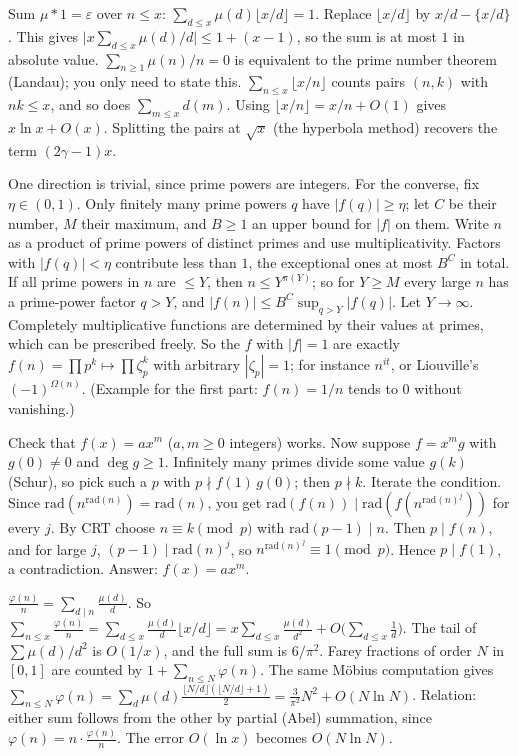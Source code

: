 \documentclass[11pt,a4paper]{article}
\begin{document}
 Sum $\mu*1=\varepsilon$ over $n\le x$: $\sum_{d\le x}\mu(d)\lfloor x/d\rfloor=1$. Replace $\lfloor x/d\rfloor$ by $x/d-\{x/d\}$. This gives $\bigl|x\sum_{d\le x}\mu(d)/d\bigr|\le1+(x-1)$, so the sum is at most $1$ in absolute value.
 $\sum_{n\ge1}\mu(n)/n=0$ is equivalent to the prime number theorem (Landau); you only need to state this.
 $\sum_{n\le x}\lfloor x/n\rfloor$ counts pairs $(n,k)$ with $nk\le x$, and so does $\sum_{m\le x}d(m)$. Using $\lfloor x/n\rfloor=x/n+O(1)$ gives $x\ln x+O(x)$. Splitting the pairs at $\sqrt x$ (the hyperbola method) recovers the term $(2\gamma-1)x$.

 One direction is trivial, since prime powers are integers. For the converse, fix $\eta\in(0,1)$. Only finitely many prime powers $q$ have $|f(q)|\ge\eta$; let $C$ be their number, $M$ their maximum, and $B\ge1$ an upper bound for $|f|$ on them.
 Write $n$ as a product of prime powers of distinct primes and use multiplicativity. Factors with $|f(q)|<\eta$ contribute less than $1$, the exceptional ones at most $B^C$ in total. If all prime powers in $n$ are $\le Y$, then $n\le Y^{\pi(Y)}$; so for $Y\ge M$ every large $n$ has a prime-power factor $q>Y$, and $|f(n)|\le B^{C}\sup_{q>Y}|f(q)|$. Let $Y\to\infty$.
 Completely multiplicative functions are determined by their values at primes, which can be prescribed freely. So the $f$ with $|f|=1$ are exactly $f(n)=\prod p^{k}\mapsto\prod\zeta_p^{k}$ with arbitrary $|\zeta_p|=1$; for instance $n^{it}$, or Liouville's $(-1)^{\Omega(n)}$. (Example for the first part: $f(n)=1/n$ tends to $0$ without vanishing.)

 Check that $f(x)=ax^m$ ($a,m\ge0$ integers) works. Now suppose $f=x^mg$ with $g(0)\ne0$ and $\deg g\ge1$. Infinitely many primes divide some value $g(k)$ (Schur), so pick such a $p$ with $p\nmid f(1)\,g(0)$; then $p\nmid k$.
 Iterate the condition. Since $\mathrm{rad}(n^{\mathrm{rad}(n)})=\mathrm{rad}(n)$, you get $\mathrm{rad}(f(n))\mid\mathrm{rad}(f(n^{\mathrm{rad}(n)^j}))$ for every $j$.
 By CRT choose $n\equiv k\pmod p$ with $\mathrm{rad}(p-1)\mid n$. Then $p\mid f(n)$, and for large $j$, $(p-1)\mid\mathrm{rad}(n)^j$, so $n^{\mathrm{rad}(n)^j}\equiv1\pmod p$. Hence $p\mid f(1)$, a contradiction. Answer: $f(x)=ax^m$.

 $\frac{\varphi(n)}n=\sum_{d\mid n}\frac{\mu(d)}d$. So $\sum_{n\le x}\frac{\varphi(n)}n=\sum_{d\le x}\frac{\mu(d)}d\lfloor x/d\rfloor=x\sum_{d\le x}\frac{\mu(d)}{d^2}+O\bigl(\sum_{d\le x}\frac1d\bigr)$. The tail of $\sum\mu(d)/d^2$ is $O(1/x)$, and the full sum is $6/\pi^2$.
 Farey fractions of order $N$ in $[0,1]$ are counted by $1+\sum_{n\le N}\varphi(n)$. The same Möbius computation gives $\sum_{n\le N}\varphi(n)=\sum_d\mu(d)\frac{\lfloor N/d\rfloor(\lfloor N/d\rfloor+1)}2=\frac3{\pi^2}N^2+O(N\ln N)$.
 Relation: either sum follows from the other by partial (Abel) summation, since $\varphi(n)=n\cdot\frac{\varphi(n)}n$. The error $O(\ln x)$ becomes $O(N\ln N)$.
\end{document}
